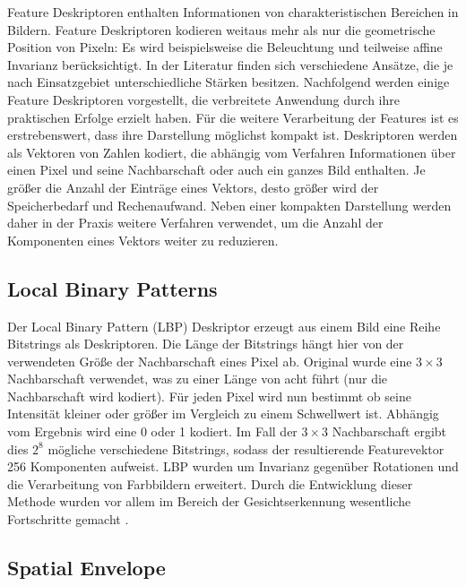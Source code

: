 Feature Deskriptoren enthalten Informationen von charakteristischen Bereichen in Bildern. Feature Deskriptoren kodieren weitaus mehr als nur die geometrische Position von Pixeln: Es wird beispielsweise die Beleuchtung und teilweise affine Invarianz berücksichtigt. In der Literatur finden sich verschiedene Ansätze, die je nach Einsatzgebiet unterschiedliche Stärken besitzen. Nachfolgend werden einige Feature Deskriptoren vorgestellt, die verbreitete Anwendung durch ihre praktischen Erfolge erzielt haben. Für die weitere Verarbeitung der Features ist es erstrebenswert, dass ihre Darstellung möglichst kompakt ist. Deskriptoren werden als Vektoren von Zahlen kodiert, die abhängig vom Verfahren Informationen über einen Pixel und seine Nachbarschaft oder auch ein ganzes Bild enthalten. Je größer die Anzahl der Einträge eines Vektors, desto größer wird der Speicherbedarf und Rechenaufwand. Neben einer kompakten Darstellung werden daher in der Praxis weitere Verfahren verwendet, um die Anzahl der Komponenten eines Vektors weiter zu reduzieren.


\subsection{Local Binary Patterns}

Der Local Binary Pattern (LBP) Deskriptor erzeugt aus einem Bild eine Reihe Bitstrings als Deskriptoren. Die Länge der Bitstrings hängt hier von der verwendeten Größe der Nachbarschaft eines Pixel ab. Original wurde eine $3 \times 3$ Nachbarschaft verwendet, was zu einer Länge von acht führt (nur die Nachbarschaft wird kodiert). Für jeden Pixel wird nun bestimmt ob seine Intensität kleiner oder größer im Vergleich zu einem Schwellwert ist. Abhängig vom Ergebnis wird eine 0 oder 1 kodiert. Im Fall der $3 \times 3$ Nachbarschaft ergibt dies $2^8$ mögliche verschiedene Bitstrings, sodass der resultierende Featurevektor 256 Komponenten aufweist. LBP wurden um Invarianz gegenüber Rotationen und die Verarbeitung von Farbbildern erweitert. Durch die Entwicklung dieser Methode wurden vor allem im Bereich der Gesichtserkennung wesentliche Fortschritte gemacht \cite{lbp2002}.

\subsection{Spatial Envelope}

